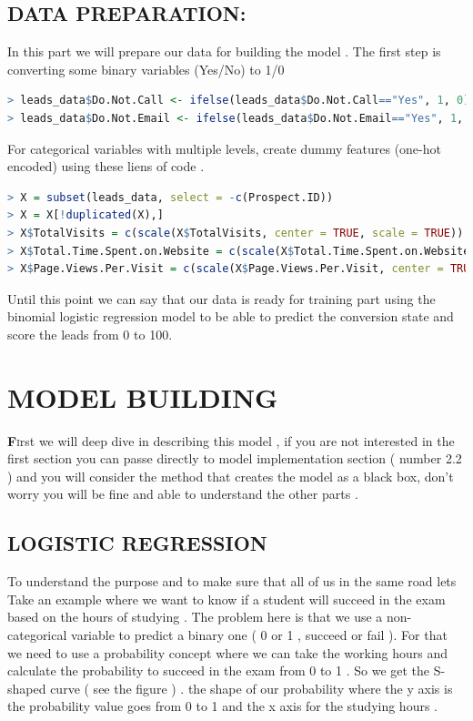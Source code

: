 \section{DATA PREPARATION:}
In this part we will prepare our data for building the model .
The first step is converting some binary variables (Yes/No) to 1/0
\begin{lstlisting}[language=R]
> leads_data$Do.Not.Call <- ifelse(leads_data$Do.Not.Call=="Yes", 1, 0)
> leads_data$Do.Not.Email <- ifelse(leads_data$Do.Not.Email=="Yes", 1, 0)
\end{lstlisting}
For categorical variables with multiple levels, create dummy features (one-hot encoded) using these liens of code .
\begin{lstlisting}[language=R]
> X = subset(leads_data, select = -c(Prospect.ID))
> X = X[!duplicated(X),]
> X$TotalVisits = c(scale(X$TotalVisits, center = TRUE, scale = TRUE))
> X$Total.Time.Spent.on.Website = c(scale(X$Total.Time.Spent.on.Website, center = TRUE, scale = TRUE))
> X$Page.Views.Per.Visit = c(scale(X$Page.Views.Per.Visit, center = TRUE, scale = TRUE))
\end{lstlisting}

Until this point we can say that our data is ready for training part using the binomial logistic regression  model to be able to predict the conversion state and score the leads from 0 to 100. 







\chapter{MODEL BUILDING}
\newpage
\lettrine[findent=2pt]{\textbf{F}}irst we will deep dive in describing this model , if you are not interested in the first section you can passe directly to model implementation section ( number 2.2 ) and you will consider the method that creates the model as a black box, don't worry you will be fine and able to understand the other parts .
\section{LOGISTIC REGRESSION}
To understand the purpose and to make sure that all of us in the same road lets Take an example where we want to know if a student will succeed in the exam based on the hours of studying . The problem here is that we use a non-categorical variable to predict a binary one ( 0 or 1 , succeed or fail ). For that we need to use a probability concept where we can take the working hours and calculate the probability to succeed in the exam from 0 to 1 .
So we get the S-shaped curve ( see the figure ) . the shape of our probability where the y axis is the probability value goes from 0 to 1 and the x axis for the studying hours . 

